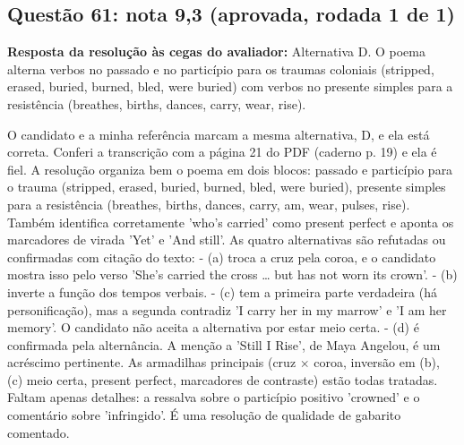 \documentclass{article}%
\begin{document}
\subsection*{Questão 61: nota 9,3 (aprovada, rodada 1 de 1)}%
\textbf{Resposta da resolução às cegas do avaliador:} Alternativa D. O poema alterna verbos no passado e no particípio para os traumas coloniais (stripped, erased, buried, burned, bled, were buried) com verbos no presente simples para a resistência (breathes, births, dances, carry, wear, rise).\par %
O candidato e a minha referência marcam a mesma alternativa, D, e ela está correta. Conferi a transcrição com a página 21 do PDF (caderno p. 19) e ela é fiel.\newline%
\newline%
A resolução organiza bem o poema em dois blocos: passado e particípio para o trauma (stripped, erased, buried, burned, bled, were buried), presente simples para a resistência (breathes, births, dances, carry, am, wear, pulses, rise). Também identifica corretamente 'who's carried' como present perfect e aponta os marcadores de virada 'Yet' e 'And still'.\newline%
\newline%
As quatro alternativas são refutadas ou confirmadas com citação do texto:\newline%
{-} (a) troca a cruz pela coroa, e o candidato mostra isso pelo verso 'She's carried the cross \ldots{} but has not worn its crown'.\newline%
{-} (b) inverte a função dos tempos verbais.\newline%
{-} (c) tem a primeira parte verdadeira (há personificação), mas a segunda contradiz 'I carry her in my marrow' e 'I am her memory'. O candidato não aceita a alternativa por estar meio certa.\newline%
{-} (d) é confirmada pela alternância.\newline%
\newline%
A menção a 'Still I Rise', de Maya Angelou, é um acréscimo pertinente. As armadilhas principais (cruz $\times$ coroa, inversão em (b), (c) meio certa, present perfect, marcadores de contraste) estão todas tratadas. Faltam apenas detalhes: a ressalva sobre o particípio positivo 'crowned' e o comentário sobre 'infringido'. É uma resolução de qualidade de gabarito comentado.%
\end{document}
